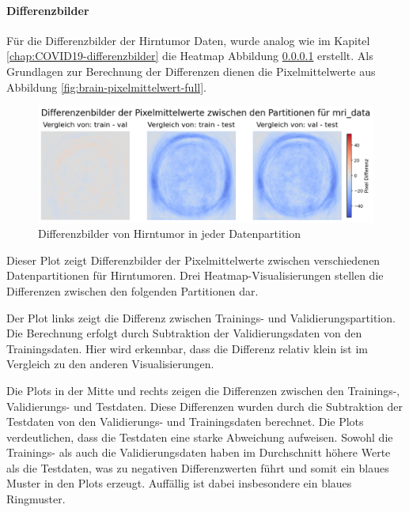 \paragraph{Differenzbilder} \label{chap:brain-differenzenbilder}
Für die Differenzbilder der Hirntumor Daten, wurde analog wie im Kapitel \ref{chap:COVID19-differenzbilder} die Heatmap Abbildung \ref{chap:brain-differenzenbilder} erstellt. Als Grundlagen zur Berechnung der Differenzen dienen die Pixelmittelwerte aus Abbildung \ref{fig:brain-pixelmittelwert-full}.

\begin{figure}[H]
    \centering
    \includegraphics[width=\linewidth]{01-images/03-data/brain-differenzenbilder.png}
    \caption{Differenzbilder von Hirntumor in jeder Datenpartition}
    \label{fig:chap:brain-differenzenbilder}
\end{figure}

Dieser Plot zeigt Differenzbilder der Pixelmittelwerte zwischen verschiedenen Datenpartitionen für Hirntumoren. Drei Heatmap-Visualisierungen stellen die Differenzen zwischen den folgenden Partitionen dar.

Der Plot links zeigt die Differenz zwischen Trainings- und Validierungspartition. Die Berechnung erfolgt durch Subtraktion der Validierungsdaten von den Trainingsdaten. Hier wird erkennbar, dass die Differenz relativ klein ist im Vergleich zu den anderen Visualisierungen.

Die Plots in der Mitte und rechts zeigen die Differenzen zwischen den Trainings-, Validierungs- und Testdaten. Diese Differenzen wurden durch die Subtraktion der Testdaten von den Validierungs- und Trainingsdaten berechnet. Die Plots verdeutlichen, dass die Testdaten eine starke Abweichung aufweisen. Sowohl die Trainings- als auch die Validierungsdaten haben im Durchschnitt höhere Werte als die Testdaten, was zu negativen Differenzwerten führt und somit ein blaues Muster in den Plots erzeugt. Auffällig ist dabei insbesondere ein blaues Ringmuster.

\newpage